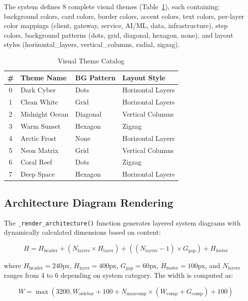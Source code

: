 The system defines 8 complete visual themes (Table~\ref{tab:themes}), each containing: background colors, card colors, border colors, accent colors, text colors, per-layer color mappings (client, gateway, service, AI/ML, data, infrastructure), step colors, background patterns (dots, grid, diagonal, hexagon, none), and layout styles (horizontal\_layers, vertical\_columns, radial, zigzag).

\begin{table}[H]
\centering
\caption{Visual Theme Catalog}
\label{tab:themes}
\begin{tabularx}{\textwidth}{|c|l|l|X|}
\hline
\textbf{\#} & \textbf{Theme Name} & \textbf{BG Pattern} & \textbf{Layout Style} \\
\hline
0 & Dark Cyber & Dots & Horizontal Layers \\
1 & Clean White & Grid & Horizontal Layers \\
2 & Midnight Ocean & Diagonal & Vertical Columns \\
3 & Warm Sunset & Hexagon & Zigzag \\
4 & Arctic Frost & None & Horizontal Layers \\
5 & Neon Matrix & Grid & Vertical Columns \\
6 & Coral Reef & Dots & Zigzag \\
7 & Deep Space & Hexagon & Horizontal Layers \\
\hline
\end{tabularx}
\end{table}

\subsection{Architecture Diagram Rendering}

The \texttt{\_render\_architecture()} function generates layered system diagrams with dynamically calculated dimensions based on content:

\begin{equation}
H = H_{\text{header}} + (N_{\text{layers}} \times H_{\text{layer}}) + ((N_{\text{layers}} - 1) \times G_{\text{gap}}) + H_{\text{footer}}
\label{eq:diagram_height}
\end{equation}

where $H_{\text{header}} = 240$px, $H_{\text{layer}} = 400$px, $G_{\text{gap}} = 60$px, $H_{\text{footer}} = 100$px, and $N_{\text{layers}}$ ranges from 4 to 6 depending on system category. The width is computed as:

\begin{equation}
W = \max(3200, W_{\text{sidebar}} + 100 + N_{\text{maxcomp}} \times (W_{\text{comp}} + G_{\text{comp}}) + 100)
\label{eq:diagram_width}
\end{equation}

